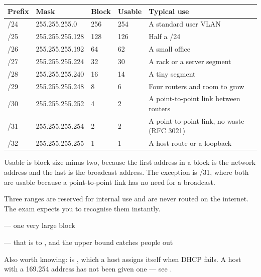 \begin{longtable}{@{}C{1.6cm}L{3.6cm}C{2.0cm}C{2.4cm}L{4.6cm}@{}}
\toprule
{}
\textbf{Prefix} & \textbf{Mask} & \textbf{Block} & \textbf{Usable} & \textbf{Typical use} \\
\midrule
\endhead
/24 & 255.255.255.0   & 256 & 254 & A standard user VLAN \\
/25 & 255.255.255.128 & 128 & 126 & Half a /24 \\
/26 & 255.255.255.192 & 64  & 62  & A small office \\
/27 & 255.255.255.224 & 32  & 30  & A rack or a server segment \\
/28 & 255.255.255.240 & 16  & 14  & A tiny segment \\
/29 & 255.255.255.248 & 8   & 6   & Four routers and room to grow \\
/30 & 255.255.255.252 & 4   & 2   & A point-to-point link between routers \\
/31 & 255.255.255.254 & 2   & 2   & A point-to-point link, no waste (RFC 3021) \\
/32 & 255.255.255.255 & 1   & 1   & A host route or a loopback \\
\bottomrule
\end{longtable}

Usable is block size minus two, because the first address in a block is the
network address and the last is the broadcast address. The exception is /31,
where both are usable because a point-to-point link has no need for a broadcast.

\begin{definitionbox}
Three ranges are reserved for internal use and are never routed on the internet.
The exam expects you to recognise them instantly.
\begin{tight}
  \item {} --- one very large block
  \item {} --- that is  to ,
        and the upper bound catches people out
  \item {}
\end{tight}
Also worth knowing:  is , which a host assigns
itself when DHCP fails. A host with a 169.254 address has not been given one ---
see .
\end{definitionbox}

